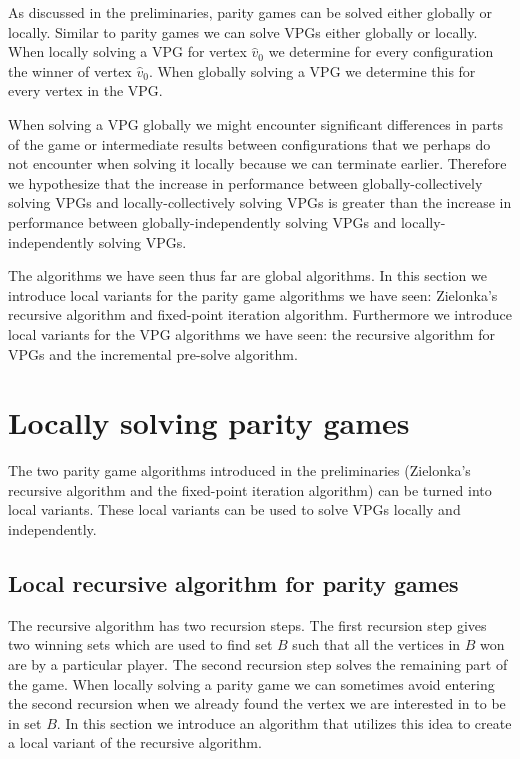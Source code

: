 As discussed in the preliminaries, parity games can be solved either globally or locally. Similar to parity games we can solve VPGs either globally or locally. When locally solving a VPG for vertex $\hat{v}_0$ we determine for every configuration the winner of vertex $\hat{v}_0$. When globally solving a VPG we determine this for every vertex in the VPG.

When solving a VPG globally we might encounter significant differences in parts of the game or intermediate results between configurations that we perhaps do not encounter when solving it locally because we can terminate earlier. Therefore we hypothesize that the increase in performance between globally-collectively solving VPGs and locally-collectively solving VPGs is greater than the increase in performance between globally-independently solving VPGs and locally-independently solving VPGs.

The algorithms we have seen thus far are global algorithms. In this section we introduce local variants for the parity game algorithms we have seen: Zielonka's recursive algorithm and fixed-point iteration algorithm. Furthermore we introduce local variants for the VPG algorithms we have seen: the recursive algorithm for VPGs and the incremental pre-solve algorithm.

\section{Locally solving parity games}
The two parity game algorithms introduced in the preliminaries (Zielonka's recursive algorithm and the fixed-point iteration algorithm) can be turned into local variants. These local variants can be used to solve VPGs locally and independently.

\subsection{Local recursive algorithm for parity games}
\label{sec:zlnk_org_local}
The recursive algorithm has two recursion steps. The first recursion step gives two winning sets which are used to find set $B$ such that all the vertices in $B$ won are by a particular player. The second recursion step solves the remaining part of the game. When locally solving a parity game we can sometimes avoid entering the second recursion when we already found the vertex we are interested in to be in set $B$. In this section we introduce an algorithm that utilizes this idea to create a local variant of the recursive algorithm.

